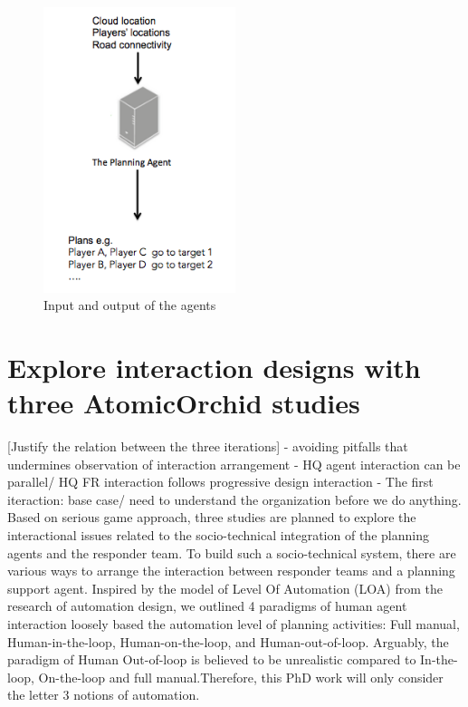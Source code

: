 \begin{figure}[h]
  \centering
  \includegraphics[width=0.5\textwidth]{img/approach/inputoutput}
  \caption{Input and output of the agents}
  \label{fig:inputoutput}
\end{figure}

\section{Explore interaction designs with three AtomicOrchid studies} \label{sec:approachPatterns}

[Justify the relation between the three iterations]
- avoiding pitfalls that undermines observation of interaction arrangement
- HQ agent interaction can be parallel/ HQ FR interaction follows progressive design interaction
- The first iteraction: base case/ need to understand the organization before we do anything.\\

Based on serious game approach, three studies are planned to explore the interactional issues related to the socio-technical integration of the planning agents and the responder team. To build such a socio-technical system, there are various ways to arrange the interaction between responder teams and a planning support agent. Inspired by the model of Level Of Automation (LOA) from the research of automation design, we outlined 4 paradigms of human agent interaction loosely based the automation level of planning activities: Full manual, Human-in-the-loop, Human-on-the-loop, and Human-out-of-loop. Arguably, the paradigm of Human Out-of-loop is believed to be unrealistic compared to In-the-loop, On-the-loop and full manual.Therefore, this PhD work will only consider the letter 3 notions of automation.\\

